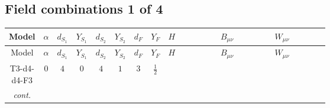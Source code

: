 \documentclass[8pt]{article}
\begin{document}
\begin{landscape}
\subsection*{Field combinations 1 of 4}
\begin{longtable}{@{}cccccccc >{\raggedright\arraybackslash}p{0.21\linewidth} >{\raggedright\arraybackslash}p{0.21\linewidth} >{\raggedright\arraybackslash}p{0.21\linewidth}@{}}
\toprule
Model & $\alpha$ & $d_{S_1}$ & $Y_{S_1}$ & $d_{S_2}$ & $Y_{S_2}$ & $d_F$ & $Y_F$ & $H$ & $B_{\mu\nu}$ & $W_{\mu\nu}$ \\
\midrule
\endfirsthead
\toprule
Model & $\alpha$ & $d_{S_1}$ & $Y_{S_1}$ & $d_{S_2}$ & $Y_{S_2}$ & $d_F$ & $Y_F$ & $H$ & $B_{\mu\nu}$ & $W_{\mu\nu}$ \\
\midrule
\endhead
T3-d4-d4-F3 & $0$ & $4$ & $0$ & $4$ & $1$ & $3$ & $\frac{1}{2}$ & \scriptsize\adjustbox{max width=\linewidth}{$\begin{gathered} +C_{\text{H2}} H_{a_1} H_{a_1}{}^{\dagger } \\ -H_{a_1} \mu ^2 H_{a_1}{}^{\dagger } \\ +\frac{8 \hbar  \overline{\lambda_5} H_{a_1} H_{a_2} \lambda_5 H_{a_1}{}^{\dagger } H_{a_2}{}^{\dagger }}{3 \epsilon }\end{gathered}$} & \scriptsize\adjustbox{max width=\linewidth}{$\begin{gathered} -\frac{13 \hbar  B_{\mu _1\mu _2}^2}{12 \epsilon } \\ -\frac{1}{3} \hbar  \log \left(\frac{\bar{\mu}^{2}}{m_2^2}\right) B_{\mu _1\mu _2}^2\end{gathered}$} & \scriptsize\adjustbox{max width=\linewidth}{$\begin{gathered} -\frac{17 \hbar  \left(W_{\mu _1\mu _2}^{A_1}\right){}^2}{6 \epsilon } \\ -\frac{5}{12} \hbar  \log \left(\frac{\bar{\mu}^{2}}{m_1^2}\right) \left(W_{\mu _1\mu _2}^{A_1}\right){}^2 \\ -\frac{5}{12} \hbar  \log \left(\frac{\bar{\mu}^{2}}{m_2^2}\right) \left(W_{\mu _1\mu _2}^{A_1}\right){}^2\end{gathered}$} \\
\textit{cont.} &  &  &  &  &  &  &  & \scriptsize\adjustbox{max width=\linewidth}{$\begin{gathered} +\frac{8 \hbar  \overline{\lambda_5} H_{a_1} H_{a_2} m_1^2 \lambda_5 H_{a_1}{}^{\dagger } H_{a_2}{}^{\dagger }}{3 \left(m_1^2-m_2^2\right)} \\ +\frac{8 \hbar  \log \left(\frac{\bar{\mu}^{2}}{m_1^2}\right) \overline{\lambda_5} H_{a_1} H_{a_2} m_1^2 \lambda_5 H_{a_1}{}^{\dagger } H_{a_2}{}^{\dagger }}{3 \left(m_1^2-m_2^2\right)} \\ -\frac{8 \hbar  \overline{\lambda_5} H_{a_1} H_{a_2} m_2^2 \lambda_5 H_{a_1}{}^{\dagger } H_{a_2}{}^{\dagger }}{3 \left(m_1^2-m_2^2\right)}\end{gathered}$} &  &  \\

\end{longtable}
\end{landscape}
\end{document}
